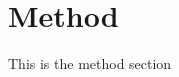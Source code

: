 \section{Method}\label{sec:method}
This is the method section \cite{linGraphenhancedLargeLanguage2024}